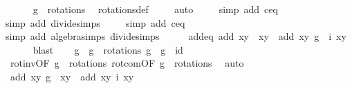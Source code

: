 \begin{isabellebody}
\ \ \ \ \isamarkupfalse%
\ {\isacartoucheopen}g\ {\isasymin}\ rotations{\isacartoucheclose}\ \isamarkupfalse%
\ rotations{\isacharunderscore}def\isanewline
\ \ \ \ \isamarkupfalse%
{\isacharparenleft}auto{\isacharparenright}\isanewline
\ \ \ \ \isamarkupfalse%
{\isacharparenleft}simp\ add{\isacharcolon}\ c{\isacharunderscore}eq{\isacharunderscore}{}{\isacharparenright}{\isacharplus}\isanewline
\ \ \ \ \isamarkupfalse%
{\isacharparenleft}simp\ add{\isacharcolon}\ divide{\isacharunderscore}simps{\isacharparenright}\isanewline
\ \ \ \ \isamarkupfalse%
{\isacharparenleft}simp\ add{\isacharcolon}\ c{\isacharunderscore}eq{\isacharunderscore}{}{\isacharparenright}{\isacharplus}\isanewline
\ \ \ \ \isamarkupfalse%
{\isacharparenleft}simp\ add{\isacharcolon}\ algebra{\isacharunderscore}simps\ divide{\isacharunderscore}simps{\isacharparenright}\isanewline
\ \ \isamarkupfalse%
\ \isamarkupfalse%
\ add{\isacharunderscore}eq{\isacharcolon}\ {\isachardoublequoteopen}add\ {\isacharparenleft}x{\isacharcomma}y{\isacharparenright}\ {\isacharparenleft}{\isasymtau}\ {\isacharparenleft}x{\isacharprime}{\isacharcomma}y{\isacharprime}{\isacharparenright}{\isacharparenright}\ {\isacharequal}\ add\ {\isacharparenleft}x{\isacharcomma}y{\isacharparenright}\ {\isacharparenleft}{\isacharparenleft}g\ {\isasymcirc}\ i{\isacharparenright}\ {\isacharparenleft}x{\isacharcomma}y{\isacharparenright}{\isacharparenright}{\isachardoublequoteclose}\isanewline
\ \ \ \ \isamarkupfalse%
\ blast\isanewline
\ \ \isamarkupfalse%
\ g{\isacharprime}\ \ {\isachardoublequoteopen}g{\isacharprime}\ {\isasymin}\ rotations{\isachardoublequoteclose}\ {\isachardoublequoteopen}g\ {\isasymcirc}\ g{\isacharprime}\ {\isacharequal}\ id{\isachardoublequoteclose}\isanewline
\ \ \ \ \isamarkupfalse%
\ rot{\isacharunderscore}inv{\isacharbrackleft}OF\ {\isacartoucheopen}g\ {\isasymin}\ rotations{\isacartoucheclose}{\isacharbrackright}\ rot{\isacharunderscore}com{\isacharbrackleft}OF\ {\isacartoucheopen}g\ {\isasymin}\ rotations{\isacartoucheclose}{\isacharbrackright}\ \isamarkupfalse%
\ auto\isanewline
\ \ \isamarkupfalse%
\ \isamarkupfalse%
\ {\isachardoublequoteopen}add\ {\isacharparenleft}x{\isacharcomma}y{\isacharparenright}\ {\isacharparenleft}g{\isacharprime}\ {\isacharparenleft}{\isasymtau}\ {\isacharparenleft}x{\isacharprime}{\isacharcomma}y{\isacharprime}{\isacharparenright}{\isacharparenright}{\isacharparenright}\ {\isacharequal}\ add\ {\isacharparenleft}x{\isacharcomma}y{\isacharparenright}\ {\isacharparenleft}i\ {\isacharparenleft}x{\isacharcomma}y{\isacharparenright}{\isacharparenright}{\isachardoublequoteclose}\isanewline

\end{isabellebody}
